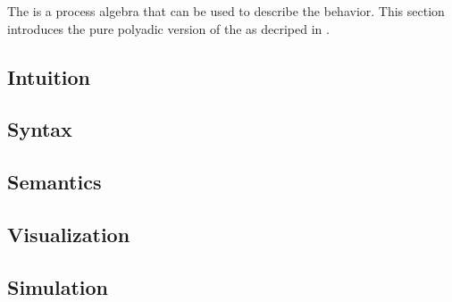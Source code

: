 The \findex[\picalc{}|(]{\picalc{}} is a process algebra that can be used to describe the behavior. This section introduces the pure polyadic version of the \picalc{} as decriped in \cite{milner}. 


\subsection{Intuition}
\label{sec_pi_intuition}


\subsection{Syntax}
\label{sec_pi_syntax}


\subsection{Semantics}
\label{sec_pi_sem}


\subsection{Visualization}
\label{sec_pi_visualization}


\subsection{Simulation}
\label{sec_pi_simulation}


\newpage %
